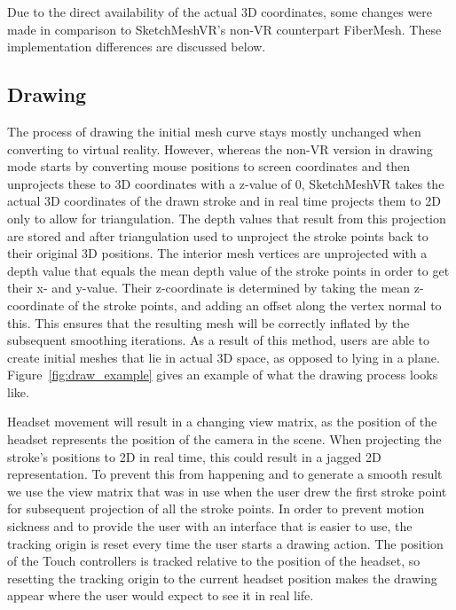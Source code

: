 Due to the direct availability of the actual 3D coordinates, some changes were made in comparison to SketchMeshVR's non-VR counterpart FiberMesh. These implementation differences are discussed below.

\subsection{Drawing}
The process of drawing the initial mesh curve stays mostly unchanged when converting to virtual reality. However, whereas the non-VR version in drawing mode starts by converting mouse positions to screen coordinates and then unprojects these to 3D coordinates with a z-value of 0, SketchMeshVR takes the actual 3D coordinates of the drawn stroke and in real time projects them to 2D only to allow for triangulation. The depth values that result from this projection are stored and after triangulation used to unproject the stroke points back to their original 3D positions. The interior mesh vertices are unprojected with a depth value that equals the mean depth value of the stroke points in order to get their x- and y-value. Their z-coordinate is determined by taking the mean z-coordinate of the stroke points, and adding an offset along the vertex normal to this. This ensures that the resulting mesh will be correctly inflated by the subsequent smoothing iterations. As a result of this method, users are able to create initial meshes that lie in actual 3D space, as opposed to lying in a plane. Figure~\ref{fig:draw_example} gives an example of what the drawing process looks like.

Headset movement will result in a changing view matrix, as the position of the headset represents the position of the camera in the scene. When projecting the stroke's positions to 2D in real time, this could result in a jagged 2D representation. To prevent this from happening and to generate a smooth result we use the view matrix that was in use when the user drew the first stroke point for subsequent projection of all the stroke points.  
In order to prevent motion sickness and to provide the user with an interface that is easier to use, the tracking origin is reset every time the user starts a drawing action. The position of the Touch controllers is tracked relative to the position of the headset, so resetting the tracking origin to the current headset position makes the drawing appear where the user would expect to see it in real life. 

